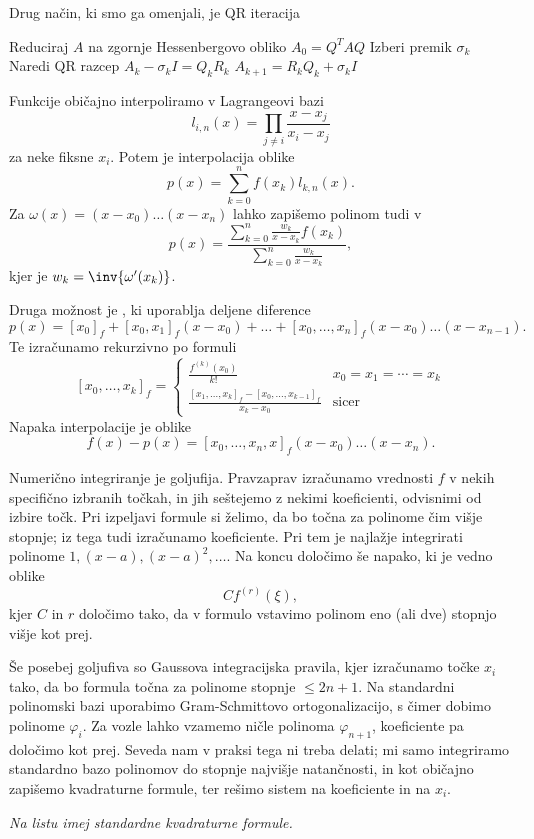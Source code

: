Drug način, ki smo ga omenjali, je QR iteracija
\begin{algorithm}
  \caption{QR iteracija z enojnim premikom}
  \begin{algorithmic}
	\State Reduciraj $A$ na zgornje Hessenbergovo obliko $A_0 = Q^T A Q$
	\State Izberi premik $\sigma_k$
	\State Naredi QR razcep $A_k - \sigma_k I = Q_k R_k$
	\State $A_{k+1} = R_k Q_k + \sigma_k I$
	\EndFor
  \end{algorithmic}
\end{algorithm}


Funkcije običajno interpoliramo v Lagrangeovi bazi
\[
  l_{i,n}(x) = \prod_{j \ne i} \frac{x-x_j}{x_i-x_j}
\]
za neke fiksne $x_i$.
Potem je interpolacija oblike
\[
  p(x) = \sum_{k=0}^n f(x_k) l_{k,n}(x).
\]
Za $\omega(x) = (x-x_0) \ldots (x-x_n)$ lahko zapišemo polinom tudi v
\[
  p(x) = \frac{
	\sum_{k=0}^n \frac{w_k}{x-x_k} f(x_k)
  }{
	\sum_{k=0}^n \frac{w_k}{x-x_k}
  },
\]
kjer je $w_k = \inv{\omega'(x_k)}$.

Druga možnost je , ki uporablja deljene diference
\[
  p(x) = [x_0]_f + [x_0, x_1]_f (x-x_0) + \ldots + [x_0, \ldots, x_n]_f (x -
  x_0) \ldots (x-x_{n-1}).
\]
Te izračunamo rekurzivno po formuli
\[
  [x_0, \ldots, x_k]_f =
  \begin{cases}
	\frac{f^{(k)}(x_0)}{k!} & x_0 = x_1 = \cdots = x_k  \\
	\frac{[x_1, \ldots, x_k]_f - [x_0, \ldots, x_{k-1}]_f}{x_k - x_0} & \text{sicer}
  \end{cases}
\]
Napaka interpolacije je oblike
\[
  f(x) - p(x) = [x_0,\ldots, x_n, x]_f (x - x_0) \ldots (x-x_n).
\]


Numerično integriranje je goljufija.
Pravzaprav izračunamo vrednosti $f$ v nekih specifično izbranih točkah, in jih
seštejemo z nekimi koeficienti, odvisnimi od izbire točk.
Pri izpeljavi formule si želimo, da bo točna za polinome čim višje stopnje; iz
tega tudi izračunamo koeficiente.
Pri tem je najlažje integrirati polinome $1, (x-a), (x-a)^2, \ldots$.
Na koncu določimo še napako, ki je vedno oblike
\[
  C f^{(r)}(\xi),
\]
kjer $C$ in $r$ določimo tako, da v formulo vstavimo polinom eno (ali dve)
stopnjo višje kot prej.

Še posebej goljufiva so Gaussova integracijska pravila, kjer izračunamo točke
$x_i$ tako, da bo formula točna za polinome stopnje $\le 2n+1$.
Na standardni polinomski bazi uporabimo Gram-Schmittovo ortogonalizacijo, s
čimer dobimo polinome $\varphi_i$.
Za vozle lahko vzamemo ničle polinoma $\varphi_{n+1}$, koeficiente pa določimo
kot prej.
Seveda nam v praksi tega ni treba delati; mi samo integriramo standardno bazo
polinomov do stopnje najvišje natančnosti, in kot običajno zapišemo kvadraturne
formule, ter rešimo sistem na koeficiente in na $x_i$.

\emph{Na listu imej standardne kvadraturne formule.}

